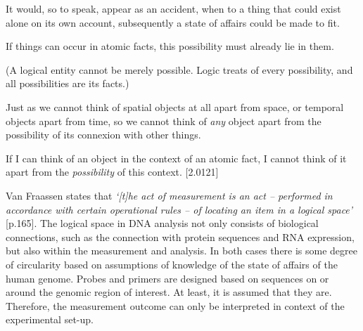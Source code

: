 \hfill\begin{minipage}{\dimexpr\textwidth-1cm}
It would, so to speak, appear as an accident, when to a thing that could exist alone on its own account, subsequently a state of affairs could be made to fit.

If things can occur in atomic facts, this possibility must already lie in them.

(A logical entity cannot be merely possible. Logic treats of every possibility, and all possibilities are its facts.)

Just as we cannot think of spatial objects at all apart from space, or temporal objects apart from time, so we cannot think of \textsl{any} object apart from the possibility of its connexion with other things.

If I can think of an object in the context of an atomic fact, I cannot think of it apart from the \textsl{possibility} of this context. \cite{Wittgenstein_1933}[2.0121]
\end{minipage} \newline \newline

\noindent Van Fraassen states that \textsl{‘[t]he act of measurement is an act – performed in accordance with certain operational rules – of locating an item in a logical space’} \cite{Fraassen_2008}[p.165]. 
The logical space in DNA analysis not only consists of biological connections, such as the connection with protein sequences and RNA expression, but also within the measurement and analysis. 
In both cases there is some degree of circularity based on assumptions of knowledge of the state of affairs of the human genome. 
Probes and primers are designed based on sequences on or around the genomic region of interest. 
At least, it is assumed that they are. 
Therefore, the measurement outcome can only be interpreted in context of the experimental set-up.
 
